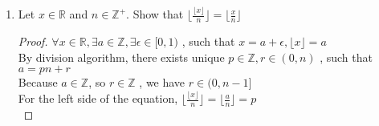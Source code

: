 \documentclass{article}
\theoremstyle{break}
\begin{document}
\begin{enumerate}
\begin{proof}
    By undamental theorem of arithmetic , we have \\
    $ a = p_{0_1}^{e_{0_1}} p_{0_2}^{e_{0_2}} \dots p_{0_r}^{e_{0_r}}$\\
    $ b_1 = p_{1_1}^{e_{1_1}} p_{1_2}^{e_{1_2}} \dots p_{1_r}^{e_{1_r}}$\\
    \dots\\
    $ b_k = p_{k_1}^{e_{k_1}} p_{k_2}^{e_{k_2}} \dots p_{k_r}^{e_{k_r}}$\\
    where $p_{k_i}$ are primes and $e_{k_i} \geq 1$\\
    Prove \textbf{if}:\\
    if $gcd(a, b_i) =1$ for every $i \in {k}$ \\
    then $\forall m,n \in \mathbb{Z}^+ $,$ p_{i_m} \neq p_{0_n}$ \\
    and $ b_1b_2 \dots b_k  =  p_{1_1}^{e_{1_1}} p_{1_2}^{e_{1_2}} \dots p_{1_r}^{e_{1_r}} \dots p_{k_1}^{e_{k_1}} p_{k_2}^{e_{k_2}} \dots p_{k_r}^{e_{k_r}} $\\
    doesn't have same divisor ${p}$ with $a$ except $1$.\\
    So $gcd(a, b_1b_2 \dots b_k) = 1 $ .\\
    Prove \textbf{only if}:
    if $gcd(a, b_1b_2 \dots b_k) = 1 $ \\
    $\forall m,n \in \mathbb{Z}^+, i \in \{k\} $ ,  $p_{0_n} \neq p_{i_m}$\\
    so $b_i$ doesn't have same divisor ${p_{i_m}}$ with $a$ except $1$.\\
    $gcd(a, b_i) =1$ for every $i \in {k}$\\
\end{proof}
\vspace{10mm}
\item Let $x \in \mathbb{R}$ and $n \in \mathbb{Z}^+$. Show that $\lfloor \frac{ \lfloor x \rfloor }{n} \rfloor = \lfloor \frac{x}{n} \rfloor$
\begin{proof}
    $ \forall x \in \mathbb{R}, \exists a \in \mathbb{Z}, \exists \epsilon \in [0,1) $ , such that $x = a + \epsilon ,\lfloor x \rfloor = a$ \\
    By division algorithm, there exists unique $p \in \mathbb{Z}, r \in (0, n)$ , such that $a=pn + r$ \\
    Because $a \in\mathbb{Z}$, so $r \in \mathbb{Z}$ , we have $r \in (0, n-1] $\\
    For the left side of the equation, $\lfloor \frac{ \lfloor x \rfloor }{n} \rfloor = \lfloor \frac{a}{n} \rfloor = p $\\

\end{proof}
\end{enumerate}
\end{document}
